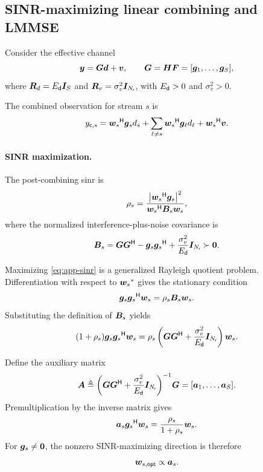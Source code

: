 \subsection{SINR-maximizing linear combining and LMMSE}
\label{app:sinr-lmmse}

Consider the effective channel
\begin{equation*}
	\bm{y}=\bm{G}\bm{d}+\bm{v},
	\qquad
	\bm{G}=\bm{H}\bm{F}
	=[\bm{g}_1,\ldots,\bm{g}_{S}],
\end{equation*}
where $\bm{R}_d=E_{\mathsf{d}}\bm{I}_{S}$ and
$\bm{R}_v=\sigma_v^2\bm{I}_{N_{\mathsf{r}}}$, with
$E_{\mathsf{d}}>0$ and $\sigma_v^2>0$.

The combined observation for stream $s$ is
\begin{equation*}
	y_{\mathsf c,s}
	={\bm{w}_s}^{\mathsf{H}}\bm{g}_s d_s
	+\sum_{\ell\neq s}
	{\bm{w}_s}^{\mathsf{H}}\bm{g}_\ell d_\ell
	+{\bm{w}_s}^{\mathsf{H}}\bm{v}.
\end{equation*}

\paragraph{SINR maximization.}
The post-combining \ac{sinr} is
\begin{equation}\label{eq:app-sinr}
	\rho_s=
	\frac{
		\left|{\bm{w}_s}^{\mathsf{H}}\bm{g}_s\right|^2
	}{
		{\bm{w}_s}^{\mathsf{H}}\bm{B}_s\bm{w}_s
	},
\end{equation}
where the normalized interference-plus-noise
covariance is
\begin{equation*}
	\bm{B}_s
	=\bm{G}{\bm{G}}^{\mathsf{H}}
	-\bm{g}_s{\bm{g}_s}^{\mathsf{H}}
	+\frac{\sigma_v^2}{E_{\mathsf{d}}}\bm{I}_{N_{\mathsf{r}}}
	\succ\bm{0}.
\end{equation*}

Maximizing \eqref{eq:app-sinr} is a generalized
Rayleigh quotient problem. Differentiation with
respect to ${\bm{w}_s}^{*}$ gives the stationary
condition
\begin{equation*}
	\bm{g}_s{\bm{g}_s}^{\mathsf{H}}\bm{w}_s
	=\rho_s\bm{B}_s\bm{w}_s.
\end{equation*}
Substituting the definition of $\bm{B}_s$ yields
\begin{equation*}
	(1+\rho_s)
	\bm{g}_s{\bm{g}_s}^{\mathsf{H}}\bm{w}_s
	=
	\rho_s
	\left(
	\bm{G}{\bm{G}}^{\mathsf{H}}
	+\frac{\sigma_v^2}{E_{\mathsf{d}}}\bm{I}_{N_{\mathsf{r}}}
	\right)\bm{w}_s.
\end{equation*}

Define the auxiliary matrix
\begin{equation*}
	\bm{A}
	\triangleq
	{\left(
		\bm{G}{\bm{G}}^{\mathsf{H}}
		+\frac{\sigma_v^2}{E_{\mathsf{d}}}\bm{I}_{N_{\mathsf{r}}}
		\right)}^{-1}\bm{G}
	=[\bm{a}_1,\ldots,\bm{a}_{S}].
\end{equation*}
Premultiplication by the inverse matrix gives
\begin{equation*}
	\bm{a}_s{\bm{g}_s}^{\mathsf{H}}\bm{w}_s
	=
	\frac{\rho_s}{1+\rho_s}\bm{w}_s.
\end{equation*}
For $\bm{g}_s\neq\bm{0}$, the nonzero
SINR-maximizing direction is therefore
\begin{equation*}
	\bm{w}_{s,\mathsf{opt}}\propto\bm{a}_s.
\end{equation*}

